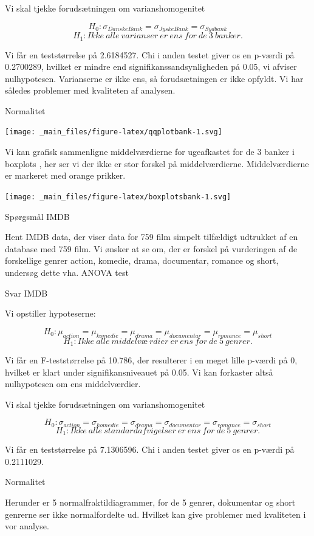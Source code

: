 \documentclass[]{book}
\begin{document}
Vi skal tjekke forudsætningen om varianshomogenitet

\[H_0:\sigma_{Danske Bank}=\sigma_{Jyske Bank}=\sigma_{Sydbank}\]\[H_1:Ikke\ alle\ varianser\ er\ ens\ for\ de\ 3\ banker.\]

Vi får en teststørrelse på 2.6184527. Chi i anden testet giver os en p-værdi på 0.2700289, hvilket er mindre end signifikanssandsynligheden på 0.05, vi afviser nulhypotesen. Varianserne er ikke ens, så forudsætningen er ikke opfyldt. Vi har således problemer med kvaliteten af analysen.

Normalitet

\texttt{[image: \_main\_files/figure-latex/qqplotbank-1.svg]}

Vi kan grafisk sammenligne middelværdierne for ugeafkastet for de 3 banker i boxplots , her ser vi der ikke er stor forskel på middelværdierne. Middelværdierne er markeret med orange prikker.

\texttt{[image: \_main\_files/figure-latex/boxplotsbank-1.svg]}

Spørgsmål IMDB

Hent IMDB data, der viser data for 759 film simpelt tilfældigt udtrukket af en database med 759 film. Vi ønsker at se om, der er forskel på vurderingen af de forskellige genrer action, komedie, drama, documentar, romance og short, undersøg dette vha. ANOVA test

Svar IMDB

Vi opstiller hypoteserne:

\[H_0:\mu_{action}=\mu_{komedie}=\mu_{drama}=\mu_{documentar}=\mu_{romance}=\mu_{short}\]\[H_1:Ikke\ alle\ middelvæ\ rdier\ er\ ens\ for\ de\ 5\ genrer.\]

Vi får en F-teststørrelse på 10.786, der resulterer i en meget lille p-værdi på 0, hvilket er klart under signifikansniveauet på 0.05. Vi kan forkaster altså nulhypotesen om ens middelværdier.

Vi skal tjekke forudsætningen om varianshomogenitet

\[H_0:\sigma_{action}=\sigma_{komedie}=\sigma_{drama}=\sigma_{documentar}=\sigma_{romance}=\sigma_{short}\]\[H_1:Ikke\ alle\ standardafvigelser\ er\ ens\ for\ de\ 5\ genrer.\]

Vi får en teststørrelse på 7.1306596. Chi i anden testet giver os en p-værdi på 0.2111029.

Normalitet

Herunder er 5 normalfraktildiagrammer, for de 5 genrer, dokumentar og short genrerne ser ikke normalfordelte ud. Hvilket kan give problemer med kvaliteten i vor analyse.
\end{document}
